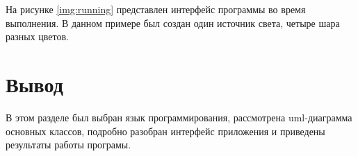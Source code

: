 На рисунке \ref{img:running} представлен интерфейс программы во время выполнения. В данном примере был создан один источник света, четыре шара разных цветов. 

\section*{Вывод}

В этом разделе был выбран язык программирования, рассмотрена uml-диаграмма основных классов, подробно разобран интерфейс приложения и приведены результаты работы програмы.

